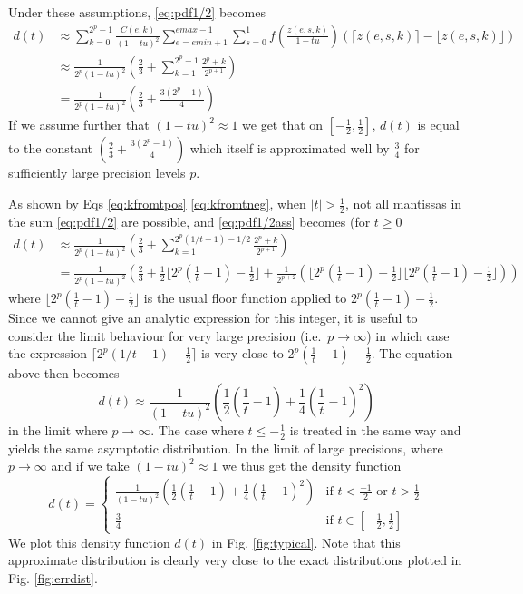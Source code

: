 \documentclass[10pt,a4paper]{article}
\theoremstyle{plain}
\theoremstyle{definition}
\newcommand{\ie}{i.e.\ }
\newcommand{\ceil}[1]{\lceil #1 \rceil}
\newcommand{\floor}[1]{\lfloor #1 \rfloor}
\newcommand{\absv}[1]{\vert #1\vert}
\begin{document}
Under these assumptions, \eqref{eq:pdf1/2} becomes
\begin{align}
d(t)&\approx\sum_{k=0}^{2^p-1}\frac{C(e,k)}{(1-tu)^2}\sum_{e=emin+1}^{emax-1}\sum_{s=0}^1 f\left(\frac{z(e,s,k)}{1-tu}\right)(\ceil{z(e,s,k)}-\floor{z(e,s,k)})\nonumber
\\
&\approx\frac{1}{2^p(1-tu)^2}\left(\frac{2}{3}+\sum_{k=1}^{2^p-1}\frac{2^p+k}{2^{p+1}}\right)\nonumber
\\
&=\frac{1}{2^p(1-tu)^2}\left(\frac{2}{3}+\frac{3(2^{p}-1)}{4}\right)\label{eq:pdf1/2ass}
\end{align}
If we assume further that $(1-tu)^2\approx 1$ we get that on $\left[-\frac{1}{2},\frac{1}{2}\right]$, $d(t)$ is equal to the constant $\left(\frac{2}{3}+\frac{3(2^{p}-1)}{4}\right)$ which itself is approximated well by $\frac{3}{4}$ for sufficiently large precision levels $p$.

As shown by Eqs \eqref{eq:kfromtpos} \eqref{eq:kfromtneg}, when $\absv{t}>\frac{1}{2}$, not all mantissas in the sum \eqref{eq:pdf1/2} are possible, and \eqref{eq:pdf1/2ass} becomes (for $t\geq 0$
\begin{align*}
d(t)&\approx\frac{1}{2^p(1-tu)^2}\left(\frac{2}{3}+\sum_{k=1}^{2^p(1/t-1)-1/2}\frac{2^p+k}{2^{p+1}}\right)
\\
&=\frac{1}{2^p(1-tu)^2}\left(\frac{2}{3}+\frac{1}{2}\floor{2^p(\frac{1}{t}-1)-\frac{1}{2}}+\frac{1}{2^{p+2}}(\floor{2^p(\frac{1}{t}-1)+\frac{1}{2}}\floor{2^p(\frac{1}{t}-1)-\frac{1}{2}})\right)
\end{align*}
where $\floor{2^p(\frac{1}{t}-1)-\frac{1}{2}}$ is the usual floor function applied to $2^p(\frac{1}{t}-1)-\frac{1}{2}$. Since we cannot give an analytic expression for this integer, it is useful to consider the limit behaviour for very large precision (\ie $p\to\infty$) in which case the expression $\ceil{2^p(1/t-1)-\frac{1}{2}}$ is very close to $2^p(\frac{1}{t}-1)-\frac{1}{2}$. The equation above then becomes
\[
d(t)\approx\frac{1}{(1-tu)^2}\left(\frac{1}{2}\left(\frac{1}{t}-1\right)+\frac{1}{4}\left(\frac{1}{t}-1\right)^2\right)
\]
in the limit where $p\to\infty$. The case where $t\leq -\frac{1}{2}$ is treated in the same way and yields the same asymptotic distribution. In the limit of large precisions, where $p\to \infty$ and if we take $(1-tu)^2\approx 1$ we thus get the density function 
\[
d(t)=\begin{cases}
\frac{1}{(1-tu)^2}\left(\frac{1}{2}\left(\frac{1}{t}-1\right)+\frac{1}{4}\left(\frac{1}{t}-1\right)^2\right) & \text{if }t< \frac{-1}{2} \text{ or }t>\frac{1}{2}\\
\frac{3}{4}&\text{if }t\in\left[-\frac{1}{2} ,\frac{1}{2}\right]
\end{cases}
\]
We plot this density function $d(t)$ in Fig. \ref{fig:typical}. Note that this approximate distribution is clearly very close to the exact distributions plotted in Fig. \ref{fig:errdist}.
\end{document}
